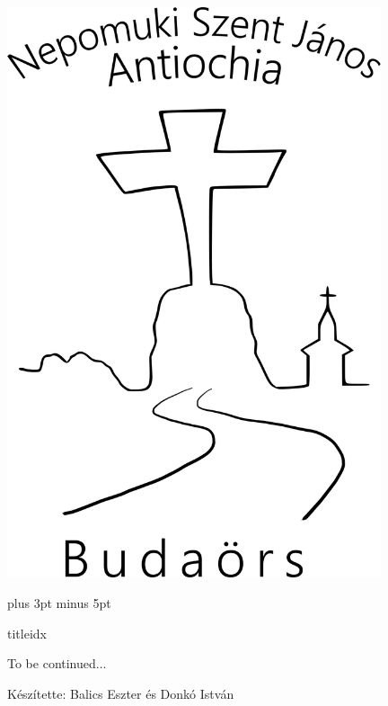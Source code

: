 \documentclass[a5paper,twoside]{article}
\author{Benkő Matyi - Donkó István}
\begin{document}
  \begin{titlepage}
    \setlength{\oddsidemargin}{-1.3cm}

    \vspace*{0.75cm}
    \includegraphics[width=11cm]{Logo_07_final}
  \end{titlepage}

  \setcounter{page}{1}


  \versesep=12pt plus 3pt minus 5pt

  \begin{songs}{titleidx}
    
  \end{songs}

  To be continued...
  \vfill

  Készítette: Balics Eszter és Donkó István

\end{document}
